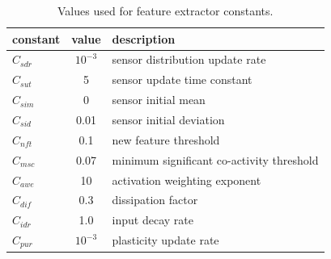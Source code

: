\begin{table}[htdp]
\caption{Values used for feature extractor constants.}
\begin{center}
\begin{tabular}{|l|c|l|}
\hline
constant & value & description\\
\hline
$C_{sdr}$ & $10^{-3}$ & sensor distribution update rate \\
$C_{sut}$ & 5 & sensor update time constant \\
$C_{sim}$ & 0 & sensor initial mean \\
$C_{sid}$ & 0.01 & sensor initial deviation \\
$C_{nft}$ & 0.1 & new feature threshold \\
$C_{msc}$ & 0.07 & minimum significant co-activity threshold \\
$C_{awe}$ & 10 & activation weighting exponent \\
$C_{dif}$ & 0.3 & dissipation factor \\
$C_{idr}$ & 1.0 & input decay rate \\
$C_{pur}$ & $10^{-3}$ & plasticity update rate \\
\hline
\end{tabular}
\end{center}
\label{perceiver_constants}
\end{table}%

